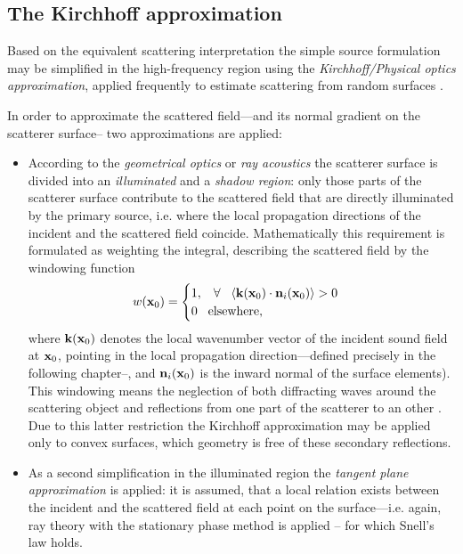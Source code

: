 \subsection{The Kirchhoff approximation}

Based on the equivalent scattering interpretation the simple source formulation may be simplified in the high-frequency region using the \emph{Kirchhoff/Physical optics approximation}, applied frequently to estimate scattering from random surfaces \cite{Voronich1999, Tsang2000}.

In order to approximate the scattered field---and its normal gradient on the scatterer surface-- two approximations are applied:
\begin{itemize}
\item According to the \emph{geometrical optics} or \emph{ray acoustics} the scatterer surface is divided into an \emph{illuminated} and a \emph{shadow region}: only those parts of the scatterer surface contribute to the scattered field that are directly illuminated by the primary source, i.e. where the local propagation directions of the incident and the scattered field coincide.
Mathematically this requirement is formulated as weighting the integral, describing the scattered field by the windowing function
\begin{equation}
w(\mathbf{x}_0) = \begin{cases}
                        1, \hspace{3mm} \forall \hspace{3mm} \langle \mathbf{k}(\mathbf{x}_0) \cdot \mathbf{n}_i(\mathbf{x}_0) \rangle > 0 \\
                        0  \hspace{3mm} \text{elsewhere},
                    \end{cases}
\end{equation}
where $\mathbf{k}(\mathbf{x}_0)$ denotes the local wavenumber vector of the incident sound field at $\mathbf{x}_0$, pointing in the local propagation direction---defined precisely in the following chapter--, and $ \mathbf{n}_i(\mathbf{x}_0)$ is the inward normal of the surface elements).
%
This windowing means the neglection of both diffracting waves around the scattering object and reflections from one part of the scatterer to an other \cite{Pignier2015}. Due to this latter restriction the Kirchhoff approximation may be applied only to convex surfaces, which geometry is free of these secondary reflections.
%
\item As a second simplification in the illuminated region the \emph{tangent plane approximation} is applied: it is assumed, that a local relation exists between the incident and the scattered field at each point on the surface---i.e. again, ray theory with the stationary phase method is applied \cite{Bleistein1984, Bleistein2000, Voronich2007}-- for which Snell's law holds.

\end{itemize}

